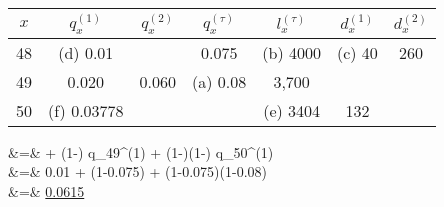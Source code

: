 {\begin{center}\begin{tabular}{|c|c|c|c|c|c|c|} \hline
   $x$ & $q_x^{(1)}$  & $q_x^{(2)}$  & $q_x^{(\tau)}$  & $l_x^{(\tau)}$  & $d_x^{(1)}$  & $d_x^{(2)}$  \\ \hline\hline
  48   &  (d) 0.01            &                    &     0.075           &     (b) 4000     &   (c) 40                  &    260 \\ \hline
  49   &    0.020             &       0.060     &  (a) 0.08         &        3,700        &                    &           \\ \hline
  50   & (f) 0.03778     &                      &                        &   (e) 3404         & 132               &           \\ \hline
  \end{tabular}\end{center}
  \bears
       &=&   + (1-) q_{49}^{(1)} + (1-)(1-) q_{50}^{(1)} \\
       &=& 0.01 \; +\;  (1-0.075) \; +\; (1-0.075)\times(1-0.08)  \\ &=&  \underline{0.0615}
  \eears




\esoln}
